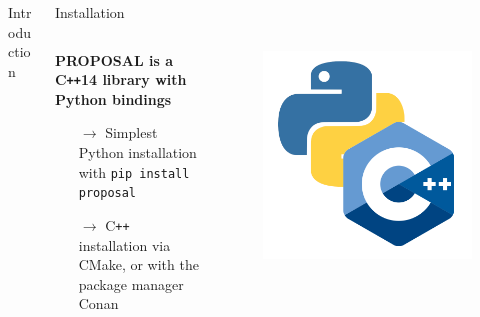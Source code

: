 \documentclass[t]{beamer}
\newlength{\itemseparation}
\begin{document}
\begin{columns}[onlytextwidth]
\begin{column}{0.6\textwidth}
\begin{block}[equal height group=A]{Introduction}
      \end{block}
    \end{column}
    \begin{column}{0.4\textwidth}%
      \begin{block}[equal height group=A]{Installation}%
        \begin{columns}[onlytextwidth]
          \begin{column}{0.7\textwidth}%
            \textbf{PROPOSAL is a C\texttt{++}14 library with Python bindings}
            \begin{itemize}
              \setlength\itemsep{\itemseparation}
              \item[$\rightarrow$] Simplest Python installation with \colorbox{tuYellow}{\texttt{pip install proposal}}
              \item[$\rightarrow$] C\texttt{++} installation via CMake, or with the package manager Conan
            \end{itemize}
          \end{column}
          \begin{column}{0.3\textwidth}%
            \vspace{-1.3cm}
            \begin{figure}
              \includegraphics[width=0.75\linewidth, keepaspectratio]{images/cpp-python.png}
            \end{figure}
          \end{column}
        \end{columns}
      \end{block}
    \end{column}
    \end{columns}
\end{document}
